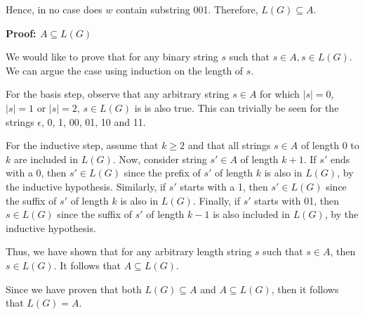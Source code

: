 \documentclass[12pt]{article}
\begin{document}
\bigskip
\noindent
Hence, in no case does $w$ contain substring 001. Therefore, $L(G) \subseteq A$.

\bigskip
\bigskip
\noindent
\textbf{Proof: $A \subseteq L(G)$}

\bigskip
\noindent
We would like to prove that for any binary string $s$ such that $s \in A, s \in L(G)$. We can argue
the case using induction on the length of $s$.

\bigskip
\noindent
For the basis step, observe that any arbitrary string $s \in A$ for which $|s|=0$, $|s|=1$ or $|s|=2$, $s \in L(G)$ is
is also true. This can trivially be seen for the strings $\epsilon$, 0, 1, 00, 01, 10 and 11.

\bigskip
\noindent
For the inductive step, assume that $k \geq 2$ and that all strings $s \in A$ of length $0$ to $k$ are included in $L(G)$.
Now, consider string $s' \in A$ of length $k+1$. If $s'$ ends with a 0, then $s' \in L(G)$ since the prefix of $s'$ of length $k$
is also in $L(G)$, by the inductive hypothesis. Similarly, if $s'$ starts with a 1, then $s' \in L(G)$ since the suffix of $s'$ of length
$k$ is also in $L(G)$. Finally, if $s'$ starts with 01, then $s \in L(G)$ since the suffix of $s'$ of length $k-1$ is also included in
$L(G)$, by the inductive hypothesis.

\bigskip
\noindent
Thus, we have shown that for any arbitrary length string $s$ such that $s \in A$, then $s \in L(G)$. It follows that $A \subseteq L(G)$.


\bigskip
\bigskip
\noindent
Since we have proven that both $L(G) \subseteq A$ and $A \subseteq L(G)$, then it
follows that $L(G) = A$.
\end{document}
